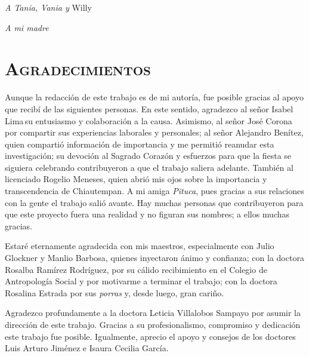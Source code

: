 \documentclass[14pt,letterpaper,twoside]{extbook} %
\begin{document}
\newpage
\pagestyle{empty}
\null\vfill


\newpage
\pagestyle{empty}

\begin{flushright}
\textit{A Tania, Vania y} Willy
\end{flushright}
\begin{flushright}
\textit{A mi madre}\textsuperscript\textdagger
\end{flushright}


\newpage
\pagestyle{empty}
\null\vfill

\chapter*{\centering\mdseries\Large\textsc{Agradecimientos}}
\pagestyle{empty}
\setcounter{page}{11}

\noindent Aunque la redacción de este trabajo es de mi autoría, fue posible gracias al apoyo que recibí de las siguientes personas. En este sentido, agradezco al señor Isabel Lima\textsuperscript\textdagger\,su entusiasmo y colaboración a la causa. Asimismo, al señor José Corona\textsuperscript\textdagger\,por compartir sus experiencias laborales y personales; al señor Alejandro Benítez, quien compartió información de importancia y me permitió reanudar esta investigación; su devoción al Sagrado Corazón y esfuerzos para que la fiesta se siguiera celebrando contribuyeron a que el trabajo saliera adelante. También al licenciado Rogelio Meneses, quien abrió mis ojos sobre la importancia y transcendencia de Chiautempan. A mi amiga \textit{Pituca}, pues gracias a sus relaciones con la gente el trabajo salió avante. Hay muchas personas que contribuyeron para que este proyecto fuera una realidad y no figuran sus nombres; a ellos muchas gracias.

Estaré eternamente agradecida con mis maestros, especialmente con Julio Glockner y Manlio Barbosa, quienes inyectaron ánimo y confianza; con la doctora Rosalba Ramírez Rodríguez, por su cálido recibimiento en el Colegio de Antropología Social y por motivarme a terminar el trabajo; con la doctora Rosalina Estrada por sus \textit{porras} y, desde luego, gran cariño.

Agradezco profundamente a la doctora Leticia Villalobos Sampayo por asumir la dirección de este trabajo. Gracias a su profesionalismo, compromiso y dedicación este trabajo fue posible. Igualmente, aprecio el apoyo y consejos de los doctores Luis Arturo Jiménez e Isaura Cecilia García.
\end{document}
